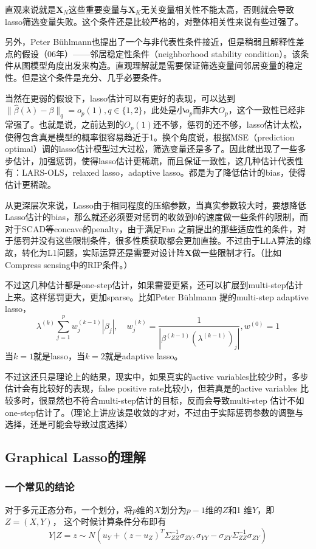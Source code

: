 ﻿\documentclass[hyperref,12pt]{ctexart}
\begin{document}
直观来说就是$\mathbf{X}_N$这些重要变量与$\mathbf{X}_K$无关变量相关性不能太高，否则就会导致lasso筛选变量失败。这个条件还是比较严格的，对整体相关性来说有些过强了。

另外，Peter B\"{u}hlmann也提出了一个与非代表性条件接近，但是稍弱且解释性差点的假设（06年）——邻居稳定性条件（neighborhood stability condition）。该条件从图模型角度出发来构造。直观理解就是需要保证筛选变量间邻居变量的稳定性。但是这个条件是充分、几乎必要条件。

当然在更弱的假设下，lasso估计可以有更好的表现，可以达到$\|\hat{\beta}(\lambda) - \beta\|_q = o_p(1), q \in \{1, 2\}$，此处是小$o_p$而非大$O_p$，这个一致性已经非常强了。也就是说，之前达到的$O_p(1)$还不够，惩罚的还不够，lasso估计太松，使得包含真是模型的概率很容易趋近于1。换个角度说，根据MSE（prediction optimal）调的lasso估计模型过大过松，筛选变量还是多了。因此就出现了一些多步估计，加强惩罚，使得lasso估计更稀疏，而且保证一致性，这几种估计代表性有：LARS-OLS，relaxed lasso，adaptive lasso。都是为了降低估计的bias，使得估计更稀疏。

从更深层次来说，Lasso由于相同程度的压缩参数，当真实参数较大时，要想降低Lasso估计的bias，那么就还必须要对惩罚的收敛到0的速度做一些条件的限制，而对于SCAD等concave的penalty，由于满足Fan 之前提出的那些适应性的条件，对于惩罚并没有这些限制条件，很多性质获取都会更加直接。不过由于LLA算法的缘故，转化为L1问题，实际运算还是需要对设计阵$\mathbf{X}$做一些限制才行。（比如Compress sensing中的RIP条件。）

不过这几种估计都是one-step估计，如果需要更紧，还可以扩展到multi-step估计上来。这样惩罚更大，更加sparse。比如Peter B\"{u}hlmann 提的multi-step adaptive lasso，
\[
\lambda^{(k)}\sum^p_{j = 1}w_j^{(k-1)}|\beta_j|,\quad w_j^{(k)} = \frac{1}{|\beta^{(k-1)}(\lambda^{(k-1)})_j|}, w^{(0)}=1
\]
当$k=1$就是lasso，当$k=2$就是adaptive lasso。

不过这还只是理论上的结果，现实中，如果真实的active variables比较少时，多步估计会有比较好的表现，false positive rate比较小，但若真是的active variables 比较多时，很显然也不符合multi-step估计的目标，反而会导致multi-step 估计不如one-step估计了。（理论上讲应该是收敛的才对，不过由于实际惩罚参数的调整与选择，还是可能会导致过度选择）


\subsection{Graphical Lasso的理解}
\subsubsection{一个常见的结论}
对于多元正态分布，一个划分，将$p$维的$X$划分为$p-1$维的$Z$和1 维$Y$，即$Z = (X, Y)$， 这个时候计算条件分布即有
\[
Y|Z = z \sim N(u_Y + (z - u_Z)^T \Sigma_{ZZ}^{-1} \sigma_{ZY}, \sigma_{YY} - \sigma_{ZY} \Sigma_{ZZ}^{-1} \sigma_{ZY})
\]
\end{document}
